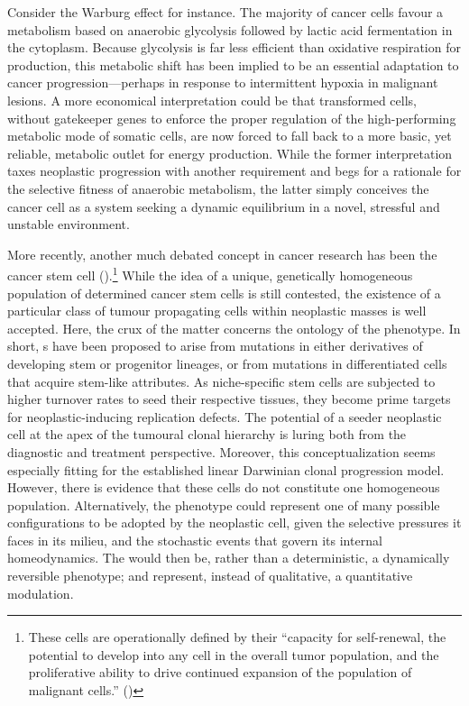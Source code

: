 Consider the Warburg effect\cite{warburg_origin_1956} for instance.  The
majority of cancer cells favour a metabolism based on anaerobic glycolysis
followed by lactic acid fermentation in the cytoplasm.  Because glycolysis is
far less efficient than oxidative respiration for  production,
this metabolic shift has been implied to be an essential adaptation to cancer
progression---perhaps in response to intermittent hypoxia in malignant
lesions.\cite{gatenby_why_2004} A more economical interpretation could be that
transformed cells, without gatekeeper genes to enforce the proper regulation of
the high-performing metabolic mode of somatic cells, are now forced to fall back
to a more basic, yet reliable, metabolic outlet for energy production.  While
the former interpretation taxes neoplastic progression with another requirement
and begs for a rationale for the selective fitness of anaerobic metabolism, the
latter simply conceives the cancer cell as a system seeking a dynamic
equilibrium in a novel, stressful and unstable environment.

More recently, another much debated concept in cancer research has been the
cancer stem cell ().\footnote{These cells are operationally
  defined by their ``capacity for self-renewal, the potential to develop into
  any cell in the overall tumor population, and the proliferative ability to
  drive continued expansion of the population of malignant cells.''
  (\citealp{jordan_cancer_2006})} While the idea of a unique, genetically
homogeneous population of determined cancer stem cells is still
contested,\cite{marotta_cancer_2009} the existence of a particular class of
tumour propagating cells within neoplastic masses is well accepted.  Here, the
crux of the matter concerns the ontology of the  phenotype.  In
short, s have been proposed to arise from mutations in either
derivatives of developing stem or progenitor lineages, or from mutations in
differentiated cells that acquire stem-like
attributes.\cite{wicha_cancer_2006,lobo_biology_2007} As niche-specific stem
cells are subjected to higher turnover rates to seed their respective tissues,
they become prime targets for neoplastic-inducing replication defects.  The
potential of a seeder neoplastic cell at the apex of the tumoural clonal
hierarchy is luring both from the diagnostic and treatment perspective.
Moreover, this conceptualization seems especially fitting for the established
linear Darwinian clonal progression model.  However, there is evidence that
these cells do not constitute one homogeneous population.  Alternatively, the
 phenotype could represent one of many possible configurations to
be adopted by the neoplastic cell, given the selective pressures it faces in its
milieu, and the stochastic events that govern its internal homeodynamics.  The
 would then be, rather than a deterministic, a dynamically
reversible phenotype; and represent, instead of qualitative, a quantitative
modulation.\cite{maenhaut_cancer_2010,tarabichi_systems_2013}

